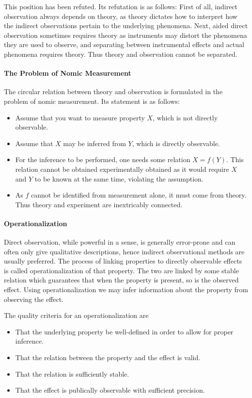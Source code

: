 This position has been refuted. Its refutation is as follows: First of all, indirect observation always depends on theory, as theory dictates how to interpret how the indirect observations pertain to the underlying phenomena. Next, aided direct observation sometimes requires theory as instruments may distort the phenomena they are used to observe, and separating between instrumental effects and actual phenomena requires theory. Thus theory and observation cannot be separated.

\paragraph{The Problem of Nomic Measurement}
The circular relation between theory and observation is formulated in the problem of nomic measurement. Its statement is as follows:

\begin{itemize}
	\item Assume that you want to measure property $X$, which is not directly observable.
	\item Assume that $X$ may be inferred from $Y$, which is directly observable.
	\item For the inference to be performed, one needs some relation $X = f(Y)$. This relation cannot be obtained experimentally obtained as it would require $X$ and $Y$ to be known at the same time, violating the assumption.
	\item As $f$ cannot be identified from measurement alone, it must come from theory. Thus theory and experiment are inextricably connected.
\end{itemize}

\paragraph{Operationalization}
Direct observation, while powerful in a sense, is generally error-prone and can often only give qualitative descriptions, hence indirect observational methods are usually preferred. The process of linking properties to directly observable effects is called operationalization of that property. The two are linked by some stable relation which guarantees that when the property is present, so is the observed effect. Using operationalization we may infer information about the property from observing the effect.

The quality criteria for an operationalization are
\begin{itemize}
	\item That the underlying property be well-defined in order to allow for proper inference.
	\item That the relation between the property and the effect is valid.
	\item That the relation is sufficiently stable.
	\item That the effect is publically observable with sufficient precision.
\end{itemize}

